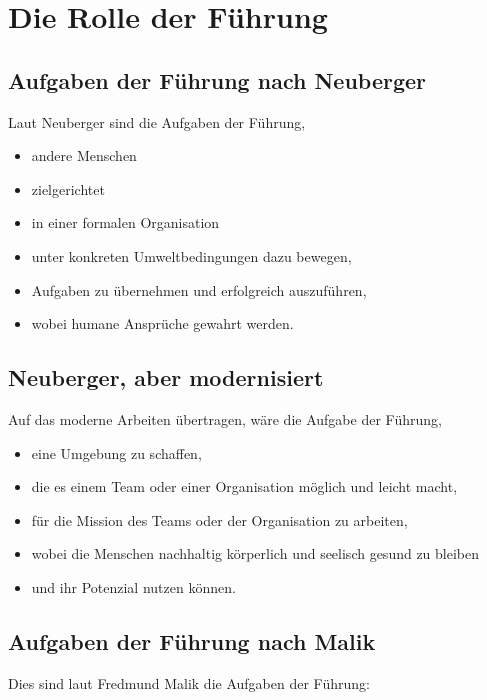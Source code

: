 \section{Die Rolle der Führung}
\label{fuehrung-rolle}


\subsection{Aufgaben der Führung nach Neuberger}
\label{fuehrung-aufgaben-neuberger}

Laut Neuberger\cite{neuberger-fuehren} sind die Aufgaben der Führung,

\begin{itemize}
  \item andere Menschen
  \item zielgerichtet
  \item in einer formalen Organisation
  \item unter konkreten Umweltbedingungen dazu bewegen,
  \item Aufgaben zu übernehmen und erfolgreich auszuführen,
  \item wobei humane Ansprüche gewahrt werden.
\end{itemize}


\subsection{Neuberger, aber modernisiert}

Auf das moderne Arbeiten übertragen, wäre die Aufgabe der Führung,

\begin{itemize}
  \item eine Umgebung zu schaffen,
  \item die es einem Team oder einer Organisation möglich und leicht macht,
  \item für die Mission des Teams oder der Organisation zu arbeiten,
  \item wobei die Menschen nachhaltig körperlich und seelisch gesund zu bleiben
  \item und ihr Potenzial nutzen können.
\end{itemize}


\subsection{Aufgaben der Führung nach Malik}
\label{fuehrung-aufgaben-malik}

Dies sind laut Fredmund Malik \cite{malik-fuehrung} die Aufgaben der Führung:

